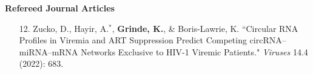 \documentclass[margin]{res}
\begin{document}
\begin{resume}
\textbf{Refereed Journal Articles}

\begin{itemize}

\item[12.] Zucko, D., Hayir, A.$^*$,  \textbf{Grinde, K.}, \& Boris-Lawrie, K. ``Circular RNA Profiles in Viremia and ART Suppression Predict Competing circRNA–miRNA–mRNA Networks Exclusive to HIV-1 Viremic Patients." \textit{Viruses} 14.4 (2022): 683. 


\end{itemize}
\end{resume}
\end{document}
